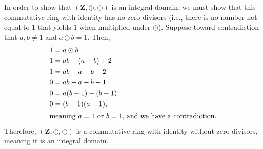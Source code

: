 \documentclass[10pt]{extarticle}
\begin{document}
  In order to show that $(\mathbf{Z},\oplus,\odot)$ is an integral domain, we must show that this commutative ring with identity has no zero divisors (i.e., there is no number not equal to $1$ that yields $1$ when multiplied under $\odot$). Suppose toward contradiction that $a,b\neq 1$ and $a\odot b = 1$. Then,
  \begin{align*}
    1 &= a\odot b\\
    1&= ab - (a+b) + 2\\
           1 &= ab - a - b + 2\\
           0 &= ab - a - b + 1\\
           0 &= a(b-1) - (b-1)\\
           0 &= (b-1)(a-1),\\
           \shortintertext{meaning $a=1$ or $b=1$, and we have a contradiction.}
  \end{align*}
  Therefore, $(\mathbf{Z},\oplus,\odot)$ is a commutative ring with identity without zero divisors, meaning it is an integral domain.
\end{document}
